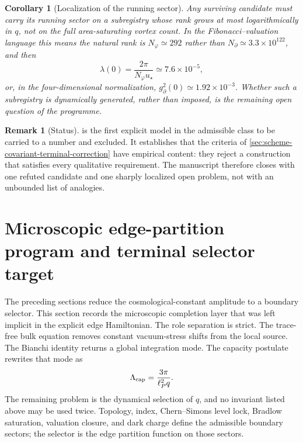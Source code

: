 \documentclass[aps,prd,reprint,nofootinbib,superscriptaddress,floatfix]{revtex4-2}
\numberwithin{equation}{section}
\theoremstyle{definition}
\newtheorem{remark}{Remark}[section]
\theoremstyle{plain}
\newtheorem{corollary}{Corollary}[section]
\begin{document}
\begin{corollary}[Localization of the running sector]
\label{cor:running-sector-localization}
Any surviving candidate must carry its running sector on a subregistry whose
rank grows at most logarithmically in \(q\), not on the full area-saturating
vortex count.  In the Fibonacci--valuation language this means the natural
rank is \(N_\varphi\simeq292\) rather than \(N_\partial\simeq3.3\times10^{122}\),
and then
\begin{equation}
\lambda(0)=\frac{2\pi}{N_\varphi u_\star}\simeq7.6\times10^{-5},
\end{equation}
or, in the four-dimensional normalization,
\(g_\partial^2(0)\simeq1.92\times10^{-3}\).  Whether such a subregistry is
dynamically generated, rather than imposed, is the remaining open question of
the programme.
\end{corollary}

\begin{remark}[Status]
 is the first explicit model in the admissible
class to be carried to a number and excluded.  It establishes that the
criteria of \cref{sec:scheme-covariant-terminal-correction} have empirical
content: they reject a construction that satisfies every qualitative
requirement.  The manuscript therefore closes with one refuted candidate and
one sharply localized open problem, not with an unbounded list of analogies.
\end{remark}



\section{Microscopic edge-partition program and terminal selector target}
\label{sec:edge-partition-completion}

The preceding sections reduce the cosmological-constant amplitude to a boundary
selector.  This section records the microscopic completion layer that was left
implicit in the explicit edge Hamiltonian.  The role separation is strict.  The
trace-free bulk equation removes constant vacuum-stress shifts from the local
source.  The Bianchi identity returns a global integration mode.  The capacity
postulate rewrites that mode as
\[
\Lambda_{\rm cap}=\frac{3\pi}{\ell_P^2 q}.
\]
The remaining problem is the dynamical selection of \(q\), and no invariant
listed above may be used twice.  Topology, index, Chern--Simons level lock,
Bradlow saturation, valuation closure, and dark charge define the admissible
boundary sectors; the selector is the edge partition function on those sectors.
\end{document}
